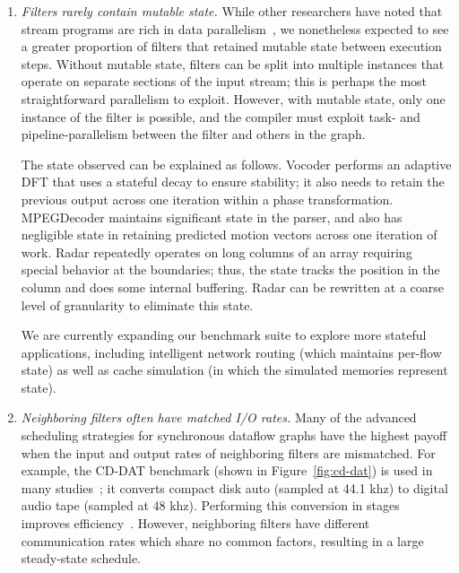 \begin{enumerate}

\item {\it Filters rarely contain mutable state.}  While other
  researchers have noted that stream programs are rich in data
  parallelism~\cite{imagine03ieee}, we nonetheless expected to see a
  greater proportion of filters that retained mutable state between
  execution steps.  Without mutable state, filters can be split into
  multiple instances that operate on separate sections of the input
  stream; this is perhaps the most straightforward parallelism to
  exploit.  However, with mutable state, only one instance of the
  filter is possible, and the compiler must exploit task- and
  pipeline-parallelism between the filter and others in the graph.

  The state observed can be explained as follows.  Vocoder performs an
  adaptive DFT that uses a stateful decay to ensure stability; it also
  needs to retain the previous output across one iteration within a
  phase transformation.  MPEGDecoder maintains significant state in
  the parser, and also has negligible state in retaining predicted
  motion vectors across one iteration of work.  Radar repeatedly
  operates on long columns of an array requiring special behavior at
  the boundaries; thus, the state tracks the position in the column
  and does some internal buffering.  Radar can be rewritten at a
  coarse level of granularity to eliminate this state.

  We are currently expanding our benchmark suite to explore more
  stateful applications, including intelligent network routing (which
  maintains per-flow state) as well as cache simulation (in which the
  simulated memories represent state).

\item {\it Neighboring filters often have matched I/O rates.}  Many of
  the advanced scheduling strategies for synchronous dataflow graphs
  have the highest payoff when the input and output rates of
  neighboring filters are mismatched.  For example, the CD-DAT
  benchmark (shown in Figure~\ref{fig:cd-dat}) is used in many
  studies~\cite{murthy_minimizing_1994,bhattacharyya_optimal_1995,teich_3d_1999,bhattacharya_quasi-static_2000,chandrachoodan_efficient_2001,murthy_buffer_2004,ko_memory-constrained_2006};
  it converts compact disk auto (sampled at 44.1 khz) to digital audio
  tape (sampled at 48 khz).  Performing this conversion in stages
  improves efficiency~\cite{murthy_minimizing_1994}.  However,
  neighboring filters have different communication rates which share
  no common factors, resulting in a large steady-state schedule.


\end{enumerate}

